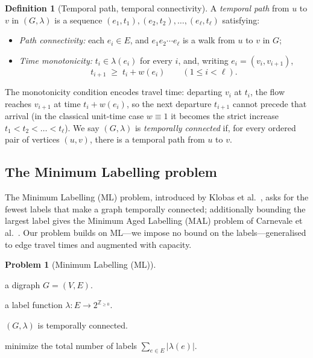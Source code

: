 \documentclass[11pt]{article}
\theoremstyle{definition}
\newtheorem{definition}{Definition}
\newtheorem{problem}{Problem}
\theoremstyle{remark}
\newcommand{\Zzero}{\mathbb{Z}_{\ge 0}}
\begin{document}
\begin{definition}[Temporal path, temporal connectivity]\label{def:tpath}
A \emph{temporal path} from $u$ to $v$ in $(G,\lambda)$ is a sequence
$(e_1,t_1),(e_2,t_2),\dots,(e_\ell,t_\ell)$ satisfying:
\begin{itemize}[topsep=2pt,itemsep=2pt]
  \item \emph{Path connectivity:} each $e_i\in E$, and $e_1e_2\cdots e_\ell$ is a walk from $u$ to $v$
        in $G$;
  \item \emph{Time monotonicity:} $t_i\in\lambda(e_i)$ for every $i$, and, writing $e_i=(v_i,v_{i+1})$,
        \[
          t_{i+1}\;\ge\;t_i+w(e_i)\qquad(1\le i<\ell).
        \]
\end{itemize}
The monotonicity condition encodes travel time: departing $v_i$ at $t_i$, the flow reaches $v_{i+1}$
at time $t_i+w(e_i)$, so the next departure $t_{i+1}$ cannot precede that arrival (in the classical
unit-time case $w\equiv 1$ it becomes the strict increase $t_1<t_2<\dots<t_\ell$). We say $(G,\lambda)$
is \emph{temporally connected} if, for every ordered pair of vertices $(u,v)$,
  there is a temporal path from $u$ to $v$.
\end{definition}

\subsection{The Minimum Labelling problem}\label{sec:mal}

The Minimum Labelling (ML) problem, introduced by Klobas et al.~\cite{KMMS24}, asks for the fewest
labels that make a graph temporally connected; additionally bounding the largest label gives the
Minimum Aged Labelling (MAL) problem of Carnevale et al.~\cite{CDO25}. Our problem builds on ML---we
impose no bound on the labels---generalised to edge travel times and augmented with capacity.

\begin{problem}[Minimum Labelling (ML)]\label{prob:ml}
\leavevmode
\begin{description}[topsep=2pt,itemsep=1pt,leftmargin=6.5em,style=nextline]
  \item[\textnormal{Input:}] a digraph $G=(V,E)$.
  \item[\textnormal{Output:}] a label function $\lambda:E\to 2^{\Zzero}$.
  \item[\textnormal{Constraint:}] $(G,\lambda)$ is temporally connected.
  \item[\textnormal{Objective:}] minimize the total number of labels $\displaystyle\sum_{e\in E}|\lambda(e)|$.
\end{description}
\end{problem}
\end{document}
